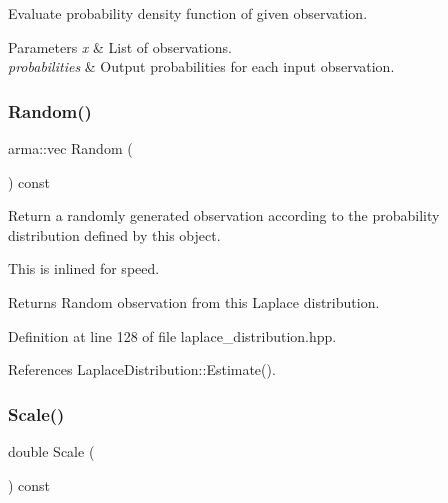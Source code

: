 Evaluate probability density function of given observation. 


\begin{DoxyParams}{Parameters}
{\em x} & List of observations. \\
\hline
{\em probabilities} & Output probabilities for each input observation. \\
\hline
\end{DoxyParams}
\mbox{\label{classmlpack_1_1distribution_1_1LaplaceDistribution_a2c6f8d5bb4eacf7de767d2172b320756}} 
\subsubsection{Random()}
{\footnotesize\ttfamily arma\+::vec Random (\begin{DoxyParamCaption}{ }\end{DoxyParamCaption}) const\hspace{0.3cm}{\ttfamily [inline]}}



Return a randomly generated observation according to the probability distribution defined by this object. 

This is inlined for speed.

\begin{DoxyReturn}{Returns}
Random observation from this Laplace distribution. 
\end{DoxyReturn}


Definition at line 128 of file laplace\+\_\+distribution.\+hpp.



References Laplace\+Distribution\+::\+Estimate().

\mbox{\label{classmlpack_1_1distribution_1_1LaplaceDistribution_ab30d1e52df44eb451081926df999fc17}} 
\subsubsection{Scale()\hspace{0.1cm}{\footnotesize\ttfamily [1/2]}}
{\footnotesize\ttfamily double Scale (\begin{DoxyParamCaption}{ }\end{DoxyParamCaption}) const\hspace{0.3cm}{\ttfamily [inline]}}



